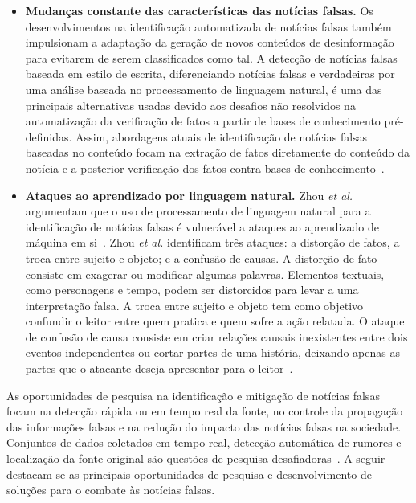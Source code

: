 \documentclass{SBCbookchapter}
\begin{document}
\begin{itemize}
\item {\bf Mudanças constante das características das notícias falsas.} Os desenvolvimentos na identificação automatizada de notícias falsas também impulsionam a adaptação da geração de novos conteúdos de desinformação para evitarem de serem classificados como tal. A detecção de notícias falsas baseada em estilo de escrita, diferenciando notícias falsas e verdadeiras por uma análise baseada no processamento de linguagem natural, é uma das principais alternativas usadas devido aos desafios não resolvidos na automatização da verificação de fatos a partir de bases de conhecimento pré-definidas. Assim, abordagens atuais de identificação de notícias falsas baseadas no conteúdo focam na extração de fatos diretamente do conteúdo da notícia e a posterior verificação dos fatos contra bases de conhecimento~\cite{ciot-nicollas-2020}.

\item {\bf Ataques ao aprendizado por linguagem natural.} Zhou {\it et al.} argumentam que o uso de processamento de linguagem natural para a identificação de notícias falsas é vulnerável a ataques ao aprendizado de máquina em si~\cite{zhou-arxiv}. Zhou {\it et al.} identificam três ataques: a distorção de fatos, a troca entre sujeito e objeto; e a confusão de causas. A distorção de fato consiste em exagerar ou modificar algumas palavras. Elementos textuais, como personagens e tempo, podem ser distorcidos para levar a uma interpretação falsa. A troca entre sujeito e objeto tem como objetivo confundir o leitor entre quem pratica e quem sofre a ação relatada. O ataque de confusão de causa consiste em criar relações causais inexistentes entre dois eventos independentes ou cortar partes de uma história, deixando apenas as partes que o atacante deseja apresentar para o leitor~\cite{zhou-arxiv}.

\end{itemize}

As oportunidades de pesquisa na identificação e mitigação de notícias falsas focam na detecção rápida ou em tempo real da fonte, no controle da propagação das informações falsas e na redução do impacto das notícias falsas na sociedade. Conjuntos de dados coletados em tempo real, detecção automática de rumores e localização da fonte original são questões de pesquisa desafiadoras~\cite{meel2020}. A seguir destacam-se as principais oportunidades de pesquisa e desenvolvimento de soluções para o combate às notícias falsas.
\end{document}
